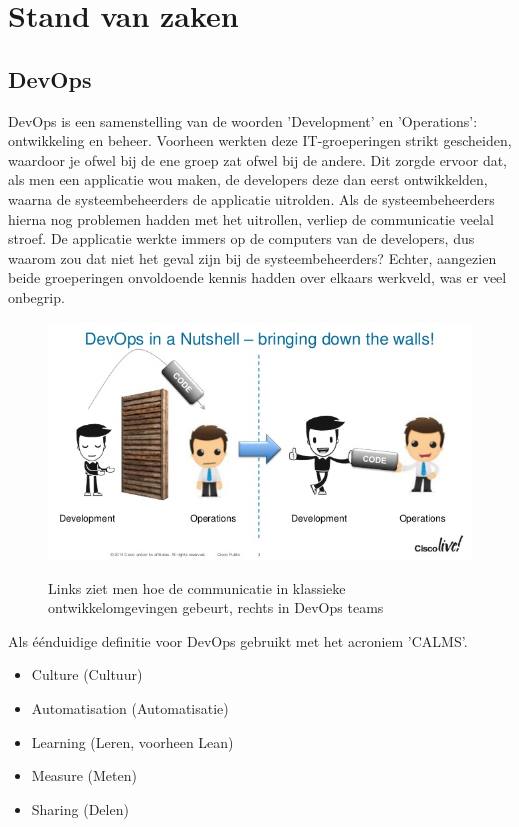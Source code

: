 \section{Stand van zaken}
\label{sec:stand-van-zaken}

\subsection{DevOps}
\label{sec:devops-uitleg}
DevOps is een samenstelling van de woorden ’Development’ en ’Operations’: ontwikkeling en beheer. Voorheen werkten deze IT-groeperingen strikt gescheiden, waardoor je ofwel bij de ene groep zat ofwel bij de andere. Dit zorgde ervoor dat, als men een applicatie wou maken, de developers deze dan eerst ontwikkelden, waarna de systeembeheerders de applicatie uitrolden. Als de systeembeheerders hierna nog problemen hadden met het uitrollen, verliep de communicatie veelal stroef. De applicatie werkte immers op de computers van de developers, dus waarom zou dat niet het geval zijn bij de systeembeheerders? Echter, aangezien beide groeperingen onvoldoende kennis hadden over elkaars werkveld, was er veel onbegrip.

\begin{figure}
	\caption{Links ziet men hoe de communicatie in klassieke ontwikkelomgevingen gebeurt, rechts in DevOps teams}
	\includegraphics[scale=0.6]{img/devopsmuur.jpg}
	\label{fig:devopsmuren}
\end{figure}

Als éénduidige definitie voor DevOps gebruikt met het acroniem 'CALMS'.
\begin{itemize}[noitemsep]
	\item Culture (Cultuur)
	\item Automatisation (Automatisatie)
	\item Learning (Leren, voorheen Lean)
	\item Measure (Meten)
	\item Sharing (Delen)
\end{itemize}

